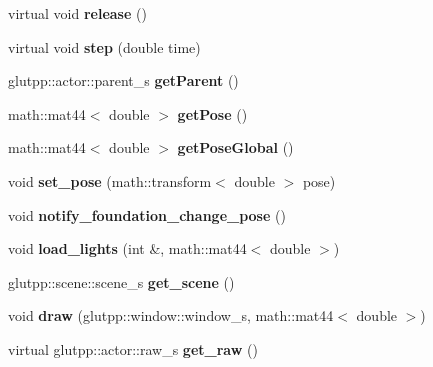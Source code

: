 \begin{DoxyCompactItemize}
\item 
\hypertarget{classglutpp_1_1actor_1_1actor_a3e31d7fa4231564b9b6c98d93c6a8d17}{virtual void {\bfseries release} ()}\label{classglutpp_1_1actor_1_1actor_a3e31d7fa4231564b9b6c98d93c6a8d17}

\item 
\hypertarget{classglutpp_1_1actor_1_1actor_ae264fd9182e417cc3d954e91f326f3af}{virtual void {\bfseries step} (double time)}\label{classglutpp_1_1actor_1_1actor_ae264fd9182e417cc3d954e91f326f3af}

\item 
\hypertarget{classglutpp_1_1actor_1_1actor_a0bc6eedd6edf5f24534d8b87c2da5de1}{glutpp\-::actor\-::parent\-\_\-s {\bfseries get\-Parent} ()}\label{classglutpp_1_1actor_1_1actor_a0bc6eedd6edf5f24534d8b87c2da5de1}

\item 
\hypertarget{classglutpp_1_1actor_1_1actor_ac46377b17926aab8f3ae2141f77936d8}{math\-::mat44$<$ double $>$ {\bfseries get\-Pose} ()}\label{classglutpp_1_1actor_1_1actor_ac46377b17926aab8f3ae2141f77936d8}

\item 
\hypertarget{classglutpp_1_1actor_1_1actor_a43b3014b932eef7a4ea16ad30ca97e31}{math\-::mat44$<$ double $>$ {\bfseries get\-Pose\-Global} ()}\label{classglutpp_1_1actor_1_1actor_a43b3014b932eef7a4ea16ad30ca97e31}

\item 
\hypertarget{classglutpp_1_1actor_1_1actor_acc1e8fdcb8fa5e7bc68d2eefecbb5c3c}{void {\bfseries set\-\_\-pose} (math\-::transform$<$ double $>$ pose)}\label{classglutpp_1_1actor_1_1actor_acc1e8fdcb8fa5e7bc68d2eefecbb5c3c}

\item 
\hypertarget{classglutpp_1_1actor_1_1actor_a25274295ccfff15c00d9dcabc1dd6192}{void {\bfseries notify\-\_\-foundation\-\_\-change\-\_\-pose} ()}\label{classglutpp_1_1actor_1_1actor_a25274295ccfff15c00d9dcabc1dd6192}

\item 
\hypertarget{classglutpp_1_1actor_1_1actor_ae80e875118aee76a8a34d6d748838029}{void {\bfseries load\-\_\-lights} (int \&, math\-::mat44$<$ double $>$)}\label{classglutpp_1_1actor_1_1actor_ae80e875118aee76a8a34d6d748838029}

\item 
\hypertarget{classglutpp_1_1actor_1_1actor_ab16316902e38071888ce842da9c93436}{glutpp\-::scene\-::scene\-\_\-s {\bfseries get\-\_\-scene} ()}\label{classglutpp_1_1actor_1_1actor_ab16316902e38071888ce842da9c93436}

\item 
\hypertarget{classglutpp_1_1actor_1_1actor_a1dfc849881bdd0c0dd838ed6effb38a6}{void {\bfseries draw} (glutpp\-::window\-::window\-\_\-s, math\-::mat44$<$ double $>$)}\label{classglutpp_1_1actor_1_1actor_a1dfc849881bdd0c0dd838ed6effb38a6}

\item 
\hypertarget{classglutpp_1_1actor_1_1actor_aaaa1656e46cf18d003f6d08d3eb0d097}{virtual glutpp\-::actor\-::raw\-\_\-s {\bfseries get\-\_\-raw} ()}\label{classglutpp_1_1actor_1_1actor_aaaa1656e46cf18d003f6d08d3eb0d097}

\end{DoxyCompactItemize}
